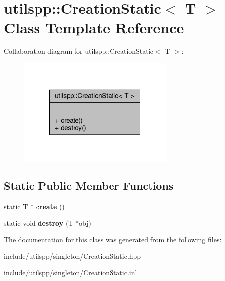 \hypertarget{classutilspp_1_1CreationStatic}{\section{utilspp\-:\-:Creation\-Static$<$ T $>$ Class Template Reference}
\label{classutilspp_1_1CreationStatic}
}


Collaboration diagram for utilspp\-:\-:Creation\-Static$<$ T $>$\-:\nopagebreak
\begin{figure}[H]
\begin{center}
\leavevmode
\includegraphics[width=216pt]{classutilspp_1_1CreationStatic__coll__graph}
\end{center}
\end{figure}
\subsection*{Static Public Member Functions}
\begin{DoxyCompactItemize}
\item 
\hypertarget{classutilspp_1_1CreationStatic_adf936d61ce6ba3f6310dc02fc368ccc9}{static T $\ast$ {\bfseries create} ()}\label{classutilspp_1_1CreationStatic_adf936d61ce6ba3f6310dc02fc368ccc9}

\item 
\hypertarget{classutilspp_1_1CreationStatic_a3470e96e86e9f7eb24d591f170645b1c}{static void {\bfseries destroy} (T $\ast$obj)}\label{classutilspp_1_1CreationStatic_a3470e96e86e9f7eb24d591f170645b1c}

\end{DoxyCompactItemize}


The documentation for this class was generated from the following files\-:\begin{DoxyCompactItemize}
\item 
include/utilspp/singleton/Creation\-Static.\-hpp\item 
include/utilspp/singleton/Creation\-Static.\-inl\end{DoxyCompactItemize}
